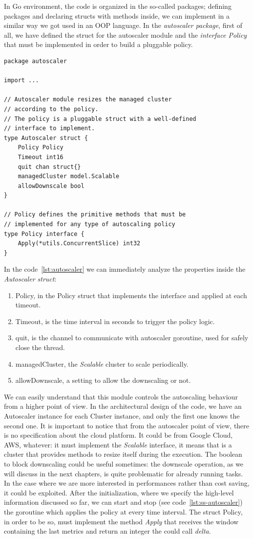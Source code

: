\documentclass[12pt,twoside,cucitura]{toptesi}
\begin{document}
In Go environment, the code is organized in the so-called packages; defining packages and declaring structs with methods inside, we can implement in a similar way we got used in an OOP language. In the \textit{autoscaler package}, first of all, we have defined the struct for the autoscaler module and the \textit{interface Policy} that must be implemented in order to build a pluggable policy. 
\begin{lstlisting}[caption={Autoscaler struct and Policy interface},label={lst:autoscaler}]
package autoscaler

import ...

// Autoscaler module resizes the managed cluster 
// according to the policy.
// The policy is a pluggable struct with a well-defined 
// interface to implement.
type Autoscaler struct {
	Policy Policy
	Timeout int16
	quit chan struct{}
	managedCluster model.Scalable
	allowDownscale bool
}

// Policy defines the primitive methods that must be 
// implemented for any type of autoscaling policy
type Policy interface {
	Apply(*utils.ConcurrentSlice) int32
}
\end{lstlisting}

In the code~\ref{lst:autoscaler} we can immediately analyze the properties inside the \textit{Autoscaler struct}:
\begin{enumerate}
	\item Policy, in the Policy struct that implements the interface and applied at each timeout.
	\item Timeout, is the time interval in seconds to trigger the policy logic.
	\item quit, is the channel to communicate with autoscaler goroutine, used for safely close the thread.
	\item managedCluster, the \textit{Scalable} cluster to scale periodically.
	\item allowDownscale, a setting to allow the downscaling or not.
\end{enumerate}

We can easily understand that this module controls the autoscaling behaviour from a higher point of view. In the architectural design of the code, we have an Autoscaler instance for each Cluster instance, and only the first one knows the second one. It is important to notice that from the autoscaler point of view, there is no specification about the cloud platform. It could be from Google Cloud, AWS, whatever: it must implement the \textit{Scalable} interface, it means that is a cluster that provides methods to resize itself during the execution. 
The boolean to block downscaling could be useful sometimes: the downscale operation, as we will discuss in the next chapters, is quite problematic for already running tasks. In the case where we are more interested in performances rather than cost saving, it could be exploited. 
After the initialization, where we specify the high-level information discussed so far, we can start and stop (see code~\ref{lst:ss-autoscaler}) the goroutine which applies the policy at every time interval.
The struct Policy, in order to be so, must implement the method \textit{Apply} that receives the window containing the last metrics and return an integer the could call \textit{delta}.
\end{document}
